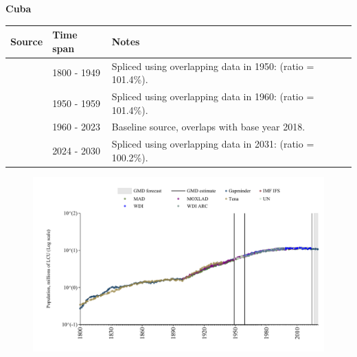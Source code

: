 \documentclass[12pt,a4paper,landscape]{article}
\begin{document}
\begin{adjustbox}{max totalsize={\paperwidth}{\paperheight},center}
\begin{minipage}[t][\textheight][t]{\textwidth}
\vspace*{0.5cm}
{}
\begin{center}
{\Large\bfseries Cuba}
\end{center}
\vspace{0.5cm}
\begin{table}[H]
\centering
\small
\begin{tabular}{|l|l|l|}
\hline
\textbf{Source} & \textbf{Time span} & \textbf{Notes} \\
\hline
\rowcolor{white}\cite{Gapminder}& 1800 - 1949 &Spliced using overlapping data in 1950: (ratio = 101.4\%).\\
\rowcolor{lightgray}\cite{IMF_IFS}& 1950 - 1959 &Spliced using overlapping data in 1960: (ratio = 101.4\%).\\
\rowcolor{white}\cite{WDI}& 1960 - 2023 &Baseline source, overlaps with base year 2018.\\
\rowcolor{lightgray}\cite{Gapminder}& 2024 - 2030 &Spliced using overlapping data in 2031: (ratio = 100.2\%).\\
\hline
\end{tabular}
\end{table}
\begin{figure}[H]
\centering
\includegraphics[width=\textwidth,height=0.6\textheight,keepaspectratio]{graphs/CUB_pop.pdf}
\end{figure}
\end{minipage}
\end{adjustbox}
\end{document}
